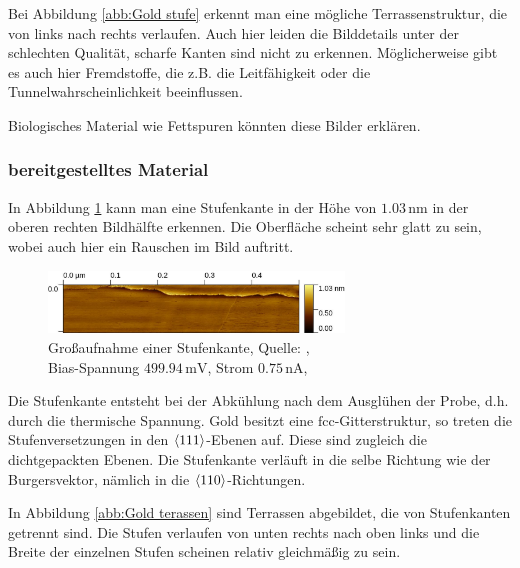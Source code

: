 \documentclass[12pt,a4paper]{scrartcl}
\numberwithin{equation}{section} %
\begin{document}
Bei Abbildung \ref{abb:Gold stufe} erkennt man eine mögliche Terrassenstruktur, die von links nach rechts verlaufen. Auch hier leiden die Bilddetails unter der schlechten Qualität, scharfe Kanten sind nicht zu erkennen. Möglicherweise gibt es auch hier Fremdstoffe, die z.B. die Leitfähigkeit oder die Tunnelwahrscheinlichkeit beeinflussen.

Biologisches Material wie Fettspuren könnten diese Bilder erklären.

\newpage
\hypertarget{bereitgestelltes-material}{%
\subsubsection{bereitgestelltes
Material}\label{bereitgestelltes-material}}

In Abbildung \ref{abb:Gold Stufenkante} kann man eine Stufenkante in der Höhe von $1.03\mathrm{\,nm}$ in der oberen rechten Bildhälfte erkennen. Die Oberfläche scheint sehr glatt zu sein, wobei auch hier ein Rauschen im Bild auftritt.

\begin{figure}[ht]
	\centering
	\includegraphics[width=0.7\textwidth]{../media/B2.5/Stufenkante.pdf}
	\caption{Großaufnahme einer Stufenkante, Quelle: \cite{Grover}, \\
			Bias-Spannung $499.94 \mathrm{\,mV}$, Strom $0.75 \mathrm{\,nA}$,}
	\label{abb:Gold Stufenkante}
\end{figure}

Die Stufenkante entsteht bei der Abkühlung nach dem Ausglühen der Probe, d.h. durch die thermische Spannung. Gold besitzt eine $\mathrm{fcc}$-Gitterstruktur, so treten die Stufenversetzungen in den $\expval{111}$-Ebenen auf. Diese sind zugleich die dichtgepackten Ebenen. Die Stufenkante verläuft in die selbe Richtung wie der Burgersvektor, nämlich in die $\expval{110}$-Richtungen.

In Abbildung \ref{abb:Gold terassen} sind Terrassen abgebildet, die von Stufenkanten getrennt sind. Die Stufen verlaufen von unten rechts nach oben links und die Breite der einzelnen Stufen scheinen relativ gleichmäßig zu sein.
\end{document}
